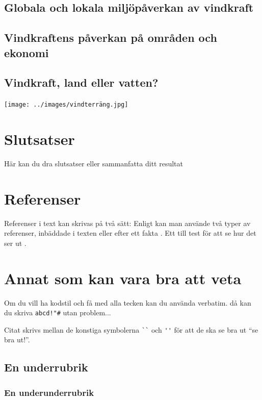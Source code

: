 \documentclass[11p]{article}
\begin{document}
    \subsection{Globala och lokala miljöpåverkan av vindkraft}
    \subsection{Vindkraftens påverkan på områden och ekonomi}
    \subsection{Vindkraft, land eller vatten?}

    \texttt{[image: ../images/vindterräng.jpg]}

    \subsection{}

    \section{Slutsatser}
    Här kan du dra slutsatser eller sammanfatta ditt resultat


    \section{Referenser}
    Referenser i text kan skrivas på två sätt: Enligt \textcite{Jens} kan man använde två typer av referenser, inbäddade i texten eller efter ett fakta \parencite{Fraenkel}. Ett till test för att se hur det ser ut \parencite[sid 55]{fermi}.

    \section{Annat som kan vara bra att veta}
    Om du vill ha kodstil och få med alla tecken kan du använda verbatim. då kan du skriva \verb|abcd!"#| utan problem...

    Citat skrivs mellan de konstiga symbolerna \verb|``| och \verb|''| för att de ska se bra ut ``se bra ut!''.
    \subsection{En underrubrik}
    \subsubsection{En underunderrubrik}
\end{document}
